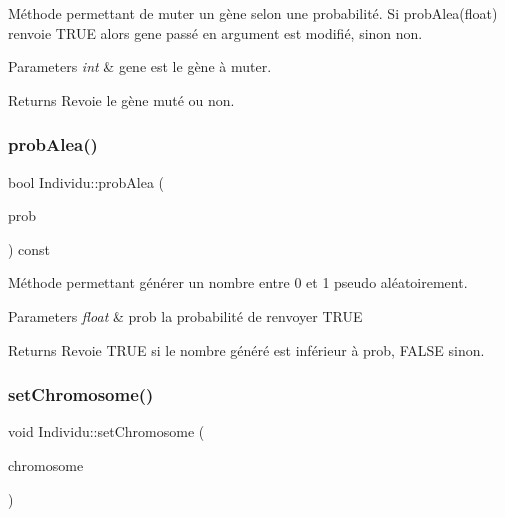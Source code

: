 Méthode permettant de muter un gène selon une probabilité. Si prob\+Alea(float) renvoie T\+R\+UE alors gene passé en argument est modifié, sinon non. 


\begin{DoxyParams}{Parameters}
{\em int} & gene est le gène à muter. \\
\hline
\end{DoxyParams}
\begin{DoxyReturn}{Returns}
Revoie le gène muté ou non. 
\end{DoxyReturn}
\mbox{\label{class_individu_aa370ed54c9e5cecffc479b5874e9226b}} 
\subsubsection{\texorpdfstring{prob\+Alea()}{probAlea()}}
{\footnotesize\ttfamily bool Individu\+::prob\+Alea (\begin{DoxyParamCaption}\item[{float}]{prob }\end{DoxyParamCaption}) const}



Méthode permettant générer un nombre entre 0 et 1 pseudo aléatoirement. 


\begin{DoxyParams}{Parameters}
{\em float} & prob la probabilité de renvoyer T\+R\+UE \\
\hline
\end{DoxyParams}
\begin{DoxyReturn}{Returns}
Revoie T\+R\+UE si le nombre généré est inférieur à prob, F\+A\+L\+SE sinon. 
\end{DoxyReturn}
\mbox{\label{class_individu_a2d678fe842fa537c79b56775bdd3d64b}} 
\subsubsection{\texorpdfstring{set\+Chromosome()}{setChromosome()}}
{\footnotesize\ttfamily void Individu\+::set\+Chromosome (\begin{DoxyParamCaption}\item[{int $\ast$}]{chromosome }\end{DoxyParamCaption})}



